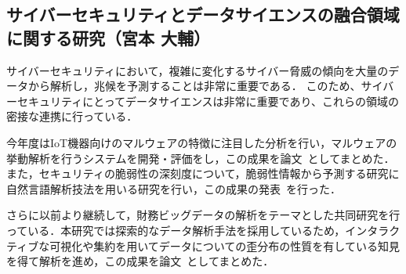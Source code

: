 \subsection{サイバーセキュリティとデータサイエンスの融合領域に関する研究（宮本 大輔）}

サイバーセキュリティにおいて，複雑に変化するサイバー脅威の傾向を大量のデータから解析し，兆候を予測することは非常に重要である．
このため、サイバーセキュリティにとってデータサイエンスは非常に重要であり、これらの領域の密接な連携に行っている．

今年度はIoT機器向けのマルウェアの特徴に注目した分析を行い，マルウェアの挙動解析を行うシステムを開発・評価をし，この成果を論文~\cite{dmiya2}としてまとめた．また，セキュリティの脆弱性の深刻度について，脆弱性情報から予測する研究に自然言語解析技法を用いる研究を行い，この成果の発表~\cite{dmiya3}を行った．

さらに以前より継続して，財務ビッグデータの解析をテーマとした共同研究を行っている．本研究では探索的なデータ解析手法を採用しているため，インタラクティブな可視化や集約を用いてデータについての歪分布の性質を有している知見を得て解析を進め，この成果を論文~\cite{dmiya1}としてまとめた．



